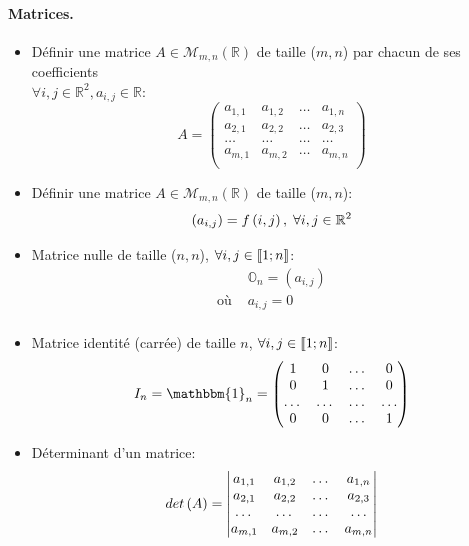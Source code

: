 \documentclass[12pt]{article}
\begin{document}
\paragraph{Matrices.}
\begin{itemize}
    \item Définir une matrice $A \in \mathcal{M}_{m, n}(\mathbb{R})$ 
        de taille ($m, n$) par chacun de ses coefficients \\ 
        $\forall i, j \in \mathbb{R}^2, a_{i, j} \in \mathbb{R}$:
        $$
        A = \begin{pmatrix}
            a_{1, 1} & a_{1, 2} & \dots & a_{1, n} \\
            a_{2, 1} & a_{2, 2} & \dots & a_{2, 3} \\
            \dots    & \dots    & \dots & \dots    \\
            a_{m, 1} & a_{m, 2} & \dots & a_{m, n} \\
        \end{pmatrix}
    $$
    \item[\Il] Définir une matrice $A \in \mathcal{M}_{m, n}(\mathbb{R})$ 
        de taille ($m, n$): $$
            \left(a_{i, j}\right) = f\left(i, j\right), \; \forall i, j \in \mathbb{R}^2
        $$
    \item[\In] Matrice nulle de taille ($n, n$),
        $\forall i, j \in \left\llbracket 1; n \right\rrbracket$: $$
    \begin{aligned}
        &\mathbb{O}_{n} = (a_{i, j}) \\
        \text{où } &a_{i, j} = 0 \\
    \end{aligned}
    $$ 

    \item Matrice identité (carrée) de taille $n$, 
        $\forall i, j \in \left\llbracket 1; n \right\rrbracket $: $$
        I_n = \mathbbm{1}_{n} = \begin{pmatrix}
            1 & 0 & \dots & 0 \\
            0 & 1 & \dots & 0 \\
            \dots & \dots & \dots & \dots \\
            0 & 0 & \dots & 1 \\
        \end{pmatrix}
    $$ 

    \item Déterminant d'un matrice: $$
        det\left(A\right) = \begin{vmatrix}
            a_{1, 1} & a_{1, 2} & \dots & a_{1, n} \\
            a_{2, 1} & a_{2, 2} & \dots & a_{2, 3} \\
            \dots    & \dots    & \dots & \dots    \\
            a_{m, 1} & a_{m, 2} & \dots & a_{m, n} \\
        \end{vmatrix}
    $$

    
\end{itemize}
\end{document}
